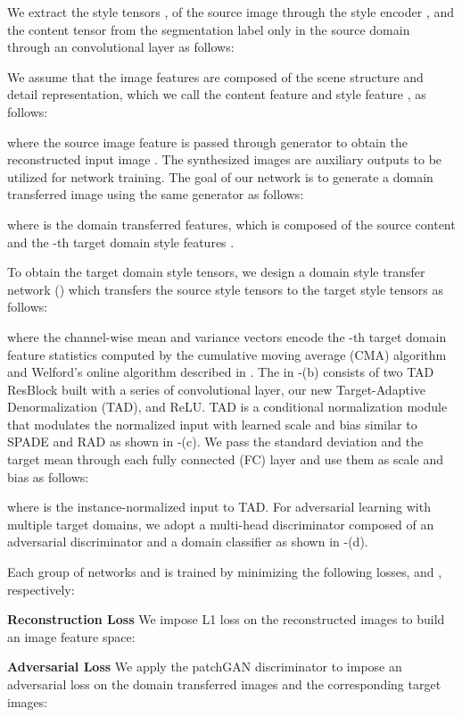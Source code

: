 We extract the style tensors ,  of the source image through the style encoder , and the content tensor  from the segmentation label only in the source domain through an  convolutional layer  as follows:


We assume that the image features are composed of the scene structure and detail representation, which we call the content feature  and style feature ,  as follows:

where the source image feature  is passed through generator  to obtain the reconstructed input image .
The synthesized images  are auxiliary outputs to be utilized for network training.
The goal of our network is to generate a domain transferred image  using the same generator  as follows:

where  is the domain transferred features, which is composed of the source content  and the -th target domain style features .

To obtain the target domain style tensors, we design a domain style transfer network () which transfers the source style tensors  to the target style tensors  as follows:

where the channel-wise mean  and variance  vectors encode the -th target domain feature statistics computed by the cumulative moving average (CMA) algorithm and Welford's online algorithm \cite{welford1962note} described in .
The  in -(b) consists of two TAD ResBlock built with a series of convolutional layer, our new Target-Adaptive Denormalization (TAD), and ReLU.
TAD is a conditional normalization module that modulates the normalized input with learned scale and bias similar to SPADE\cite{park2019semantic} and RAD\cite{richter2021enhancing} as shown in -(c).
We pass the standard deviation  and the target mean  through each fully connected (FC) layer and use them as scale and bias as follows:

where  is the instance-normalized \cite{ulyanov2016instance} input to TAD.
For adversarial learning with multiple target domains, we adopt a multi-head discriminator composed of an adversarial discriminator  and a domain classifier  as shown in -(d). 


Each group of networks  and  is trained by minimizing the following losses,  and , respectively:


\noindent\textbf{Reconstruction Loss} 
We impose L1 loss on the reconstructed images  to build an image feature space: 


\noindent\textbf{Adversarial Loss}
We apply the patchGAN \cite{isola2017image} discriminator  to impose an adversarial loss on the domain transferred images and the corresponding target images:


